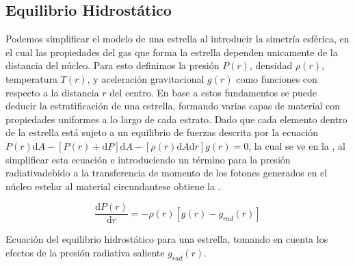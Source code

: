\subsection{Equilibrio Hidrostático}

Podemos simplificar el modelo de una estrella al introducir la simetría
esférica, en el cual las propiedades del gas que forma la estrella dependen
unicamente de la distancia del núcleo. Para esto definimos la presión $P(r)$,
densidad $\rho (r)$, temperatura $T(r)$, y aceleración gravitacional $g(r)$ como
funciones con respecto a la distancia $r$ del centro. En base a estos
fundamentos se puede deducir la estratificación de una estrella, formando varias
capas de material con propiedades uniformes a lo largo de cada estrato. Dado que
cada elemento dentro de la estrella está sujeto a un equilibrio de fuerzas descrita 
por la ecuación $P(r) \mathrm{d}A - [P(r) + \mathrm{d}P] \mathrm{d}A - [\rho(r) 
\mathrm{d}A \mathrm{d}r] g(r) = 0$, la cual se ve en la
, al simplificar esta ecuación e
introduciendo un término para la presión radiativa\textemdash debido a la
transferencia de momento de los fotones generados en el núcleo estelar al
material circundante\textemdash se obtiene la
. 

\begin{eqfloat}[!ht]
	\centering
	\begin{equation}
		\frac{\textrm{d}P(r)}{\textrm{d}r} = -\rho(r) [g(r) - g_{rad}(r)]
	\end{equation}
	\caption{Ecuación del equilibrio hidrostático para una estrella, tomando en
	cuenta los efectos de la presión radiativa saliente $g_{rad}(r)$.
	}
	\label{ecuacionEquilibrioHistrostatico}
\end{eqfloat}

